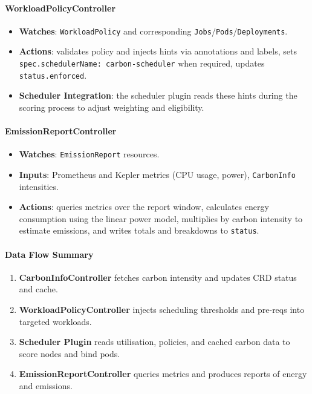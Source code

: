 \documentclass{article}
\begin{document}
\paragraph{WorkloadPolicyController}
\begin{itemize}
  \item \textbf{Watches}: \texttt{WorkloadPolicy} and corresponding \texttt{Jobs}/\texttt{Pods}/\texttt{Deployments}.
  \item \textbf{Actions}: validates policy and injects hints via annotations and labels,
        sets \texttt{spec.schedulerName: carbon-scheduler} when required,
        updates \texttt{status.enforced}.
  \item \textbf{Scheduler Integration}: the scheduler plugin reads these hints during the scoring process to
        adjust weighting and eligibility.
\end{itemize}

\paragraph{EmissionReportController}
\begin{itemize}
  \item \textbf{Watches}: \texttt{EmissionReport} resources.
  \item \textbf{Inputs}: Prometheus and Kepler metrics (CPU usage, power), \texttt{CarbonInfo} intensities.
  \item \textbf{Actions}: queries metrics over the report window, calculates energy consumption using the linear power model,
        multiplies by carbon intensity to estimate emissions, and writes totals and breakdowns to \texttt{status}.
\end{itemize}

\paragraph{Data Flow Summary}
\begin{enumerate}
  \item \textbf{CarbonInfoController} fetches carbon intensity and updates CRD status and cache.
  \item \textbf{WorkloadPolicyController} injects scheduling thresholds and pre-reqs into targeted workloads.
  \item \textbf{Scheduler Plugin} reads utilisation, policies, and cached carbon data to score nodes and bind pods.
  \item \textbf{EmissionReportController} queries metrics and produces reports of energy and emissions.
\end{enumerate}
\end{document}
